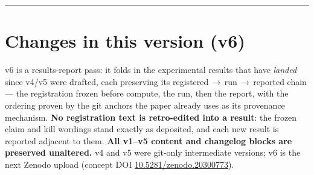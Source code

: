 \documentclass[11pt,a4paper]{article}
\newcommand{\Pomega}{P_{\omega}}
\begin{document}
\begin{abstract}
Five levels stand: formal verification at L0, monotonic $\rho$-collapse at L1, engineering implications and corridor measurement at L2, cross-substrate universality at L3, agency and consent at A3+ at L4. Ubuntu is the ground all five levels stand on. The universal-scale tier ($\Pomega$ construction, the Penrose past structural argument, asymptotic conditioning) is a research-program coda, not a stable level --- F-11 has fired on the joint $\Pomega$ and D4 (CMB anomalies as TSVF signatures) is retracted (\S\ref{sec:open-research}). One universal-scale result is proved rather than conjectural --- the orthogonality theorem (\S\ref{sec:open-research}): the soft $\Pomega$ leaves the bulk CMB power spectrum exactly invariant, making the framework a strict extension of $\Lambda$CDM at the cosmological tier. The manuscript separates engineering results, formal lake-tier claims (Tier A derivations, Tier C definitional commitments, Tier D axiomatized framework primitives), empirical anchors, and interpretive synthesis explicitly, so each layer is evaluable on its own terms. The recurrence-across-levels is the bet, not a derivation; the engineering anchor stands separately, and the interpretive synthesis is offered for scrutiny rather than acceptance.
\end{abstract}

\tableofcontents
\vspace{1em}

\hrule
\vspace{1em}

\section*{Changes in this version (v6)}

v6 is a results-report pass: it folds in the experimental results that have \emph{landed} since v4/v5 were drafted, each preserving its registered$\,\to\,$run$\,\to\,$reported chain --- the registration frozen before compute, the run, then the report, with the ordering proven by the git anchors the paper already uses as its provenance mechanism. \textbf{No registration text is retro-edited into a result}: the frozen claim and kill wordings stand exactly as deposited, and each new result is reported adjacent to them. \textbf{All v1--v5 content and changelog blocks are preserved unaltered.} v4 and v5 were git-only intermediate versions; v6 is the next Zenodo upload (concept DOI \href{https://doi.org/10.5281/zenodo.20300773}{10.5281/zenodo.20300773}).
\end{document}
